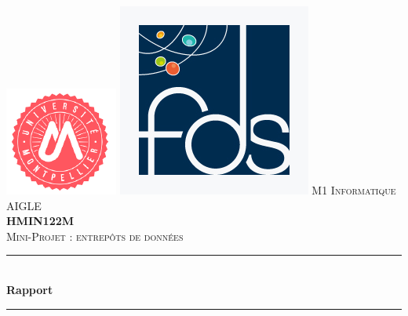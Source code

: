 \documentclass[a4paper,12pt]{report}
\begin{document}
\begin{titlepage}
\newcommand{\HRule}{\rule{\linewidth}{0.5mm}} %
\center
\includegraphics[scale=0.5]{images/umLogo.png} %
\hspace{\fill}
\includegraphics[scale=0.25]{images/fdsLogo.jpg} %
\textsc{\LARGE M1 Informatique AIGLE}\\[1cm]
\textsc{\Large \textbf{HMIN122M}}\\[0.25cm]
\textsc{\large Mini-Projet : entrepôts de données}\\[0.8cm]
\HRule \\[0.4cm]
{ \huge \bfseries Rapport}\\[0.4cm]
\HRule \\[0.8cm]

\end{titlepage}
\end{document}
